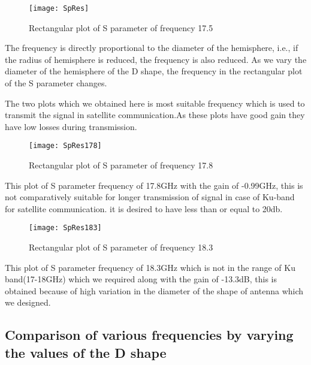\documentclass[12pt]{article}
\begin{document}
\begin{center}
\begin{figure}[H]
    \centering
    \texttt{[image: SpRes]}
    \caption{Rectangular plot of S parameter of frequency 17.5}
    \label{fig:Rectangular plot of S parameter of frequency 17.5}
\end{figure}
\end{center}
\par  The frequency is directly proportional to the diameter of the hemisphere, i.e., if the radius of hemisphere is reduced, the frequency is also reduced. As we vary the diameter of the hemisphere of the D shape, the frequency in the rectangular plot of the S parameter changes.\\
\par The two plots which we obtained here is most suitable frequency which is used to transmit the signal in satellite communication.As these plots have good gain  they have low losses during transmission.


\begin{center}
\begin{figure}[H]
    \centering
    \texttt{[image: SpRes178]}
    \caption{Rectangular plot of S parameter of frequency 17.8}
    \label{fig:Rectangular plot of S parameter of frequency 17.8}
\end{figure}
\end{center}
\par This plot of S parameter frequency of 17.8GHz with the gain of -0.99GHz, this is not comparatively suitable for longer transmission of signal in case of Ku-band for satellite communication. it is desired to have less than or equal to 20db.


\begin{center}
\begin{figure}[H]
    \centering
    \texttt{[image: SpRes183]}
    \caption{Rectangular plot of S parameter of frequency 18.3}
    \label{fig:Rectangular plot of S parameter of frequency 18.3}
\end{figure}
\end{center}
\par This plot of S parameter frequency of 18.3GHz which is not in the range of Ku band(17-18GHz) which we required along with the gain of -13.3dB, this is obtained because of high variation in the diameter of the shape of antenna which we designed.

\subsection{Comparison of various frequencies by varying the values of the D shape}
\end{document}
